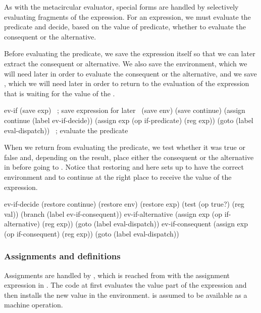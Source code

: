 As with the metacircular evaluator, special forms are handled by selectively
evaluating fragments of the expression.  For an  expression, we must
evaluate the predicate and decide, based on the value of predicate, whether to
evaluate the consequent or the alternative.

Before evaluating the predicate, we save the  expression itself so
that we can later extract the consequent or alternative.  We also save the
environment, which we will need later in order to evaluate the consequent or
the alternative, and we save , which we will need later in order
to return to the evaluation of the expression that is waiting for the value of
the .

\begin{codeBlock}
ev-if
  (save exp)                    ~\textrm{; save expression for later}~
  (save env)
  (save continue)
  (assign continue (label ev-if-decide))
  (assign exp (op if-predicate) (reg exp))
  (goto (label eval-dispatch))  ~\textrm{; evaluate the predicate}~
\end{codeBlock}

\noindent
When we return from evaluating the predicate, we test whether it was true or
false and, depending on the result, place either the consequent or the
alternative in  before going to .  Notice that
restoring  and  here sets up  to
have the correct environment and to continue at the right place to receive the
value of the  expression.

\begin{codeBlock}
ev-if-decide
  (restore continue)
  (restore env)
  (restore exp)
  (test (op true?) (reg val))
  (branch (label ev-if-consequent))
ev-if-alternative
  (assign exp (op if-alternative) (reg exp))
  (goto (label eval-dispatch))
ev-if-consequent
  (assign exp (op if-consequent) (reg exp))
  (goto (label eval-dispatch))
\end{codeBlock}

\subsubsection*{Assignments and definitions}

Assignments are handled by , which is reached from
 with the assignment expression in .  The code at
 first evaluates the value part of the expression and then
installs the new value in the environment.   is
assumed to be available as a machine operation.

